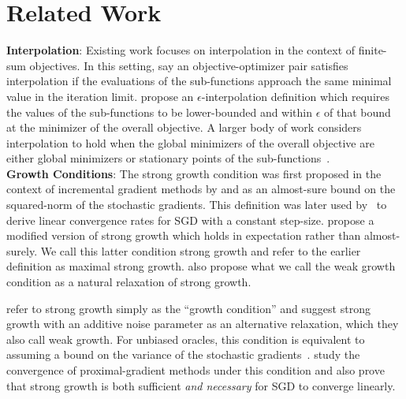 




\section{Related Work}


\noindent \textbf{Interpolation}:
Existing work focuses on interpolation in the context of finite-sum objectives. 
In this setting, \citet{bassily2018exponential} say an objective-optimizer pair satisfies interpolation if the evaluations of the sub-functions approach the same minimal value in the iteration limit. 
\citet{berrada2019training} propose an \( \epsilon \)-interpolation definition which requires the values of the sub-functions to be lower-bounded and within \( \epsilon  \) of that bound at the minimizer of the overall objective. 
A larger body of work considers interpolation to hold when the global minimizers of the overall objective are either global minimizers or stationary points of the sub-functions~\cite{vaswani2019fast, vaswani2019painless, vaswani2020adaptive, meng2020fastandfurious, loizou2020sps}.\\

\noindent \textbf{Growth Conditions}:
The strong growth condition was first proposed in the context of incremental gradient methods by \citet{solodov1998incremental} and \citet{tseng1998incremental} as an almost-sure bound on the squared-norm of the stochastic gradients. 
This definition was later used by~\citet{schmidt2013fast} to derive linear convergence rates for \ac{SGD} with a constant step-size. 
\citet{vaswani2019fast} propose a modified version of strong growth which holds in expectation rather than almost-surely. 
We call this latter condition strong growth and refer to the earlier definition as maximal strong growth.
\citet{vaswani2019fast} also propose what we call the weak growth condition as a natural relaxation of strong growth. 

\citet{cevher2018linear} refer to strong growth simply as the ``growth condition'' and suggest strong growth with an additive noise parameter as an alternative relaxation, which they also call weak growth.
For unbiased oracles, this condition is equivalent to assuming a bound on the variance of the stochastic gradients~\citep{khaled2020better, ghadimi2012optimal1}.
\citet{cevher2018linear} study the convergence of proximal-gradient methods under this condition and also prove that strong growth is both sufficient \emph{and necessary} for \ac{SGD} to converge linearly.\\


